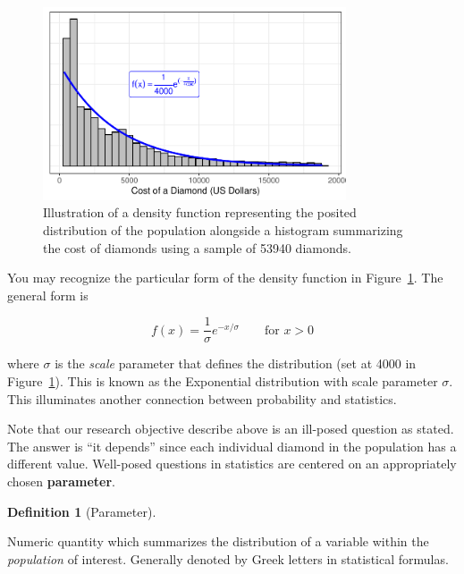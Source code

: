 \documentclass[
  letterpaper,
  DIV=11,
  numbers=noendperiod]{scrreprt}
\theoremstyle{definition}
\newtheorem{definition}{Definition}[chapter]
\theoremstyle{definition}
\theoremstyle{plain}
\theoremstyle{remark}
\begin{document}
\begin{figure}

{\centering \includegraphics[width=0.8\textwidth,height=\textheight]{./images/fig-randomvariables-density-1.pdf}

}

\caption{\label{fig-randomvariables-density}Illustration of a density
function representing the posited distribution of the population
alongside a histogram summarizing the cost of diamonds using a sample of
53940 diamonds.}

\end{figure}

You may recognize the particular form of the density function in
Figure~\ref{fig-randomvariables-density}. The general form is

\[f(x) = \frac{1}{\sigma} e^{-x / \sigma} \qquad \text{for } x > 0\]

where \(\sigma\) is the \emph{scale} parameter that defines the
distribution (set at 4000 in Figure~\ref{fig-randomvariables-density}).
This is known as the Exponential distribution with scale parameter
\(\sigma\). This illuminates another connection between probability and
statistics.

Note that our research objective describe above is an ill-posed question
as stated. The answer is ``it depends'' since each individual diamond in
the population has a different value. Well-posed questions in statistics
are centered on an appropriately chosen \textbf{parameter}.

\begin{definition}[Parameter]\protect\hypertarget{def-parameter}{}\label{def-parameter}

Numeric quantity which summarizes the distribution of a variable within
the \emph{population} of interest. Generally denoted by Greek letters in
statistical formulas.

\end{definition}
\end{document}
